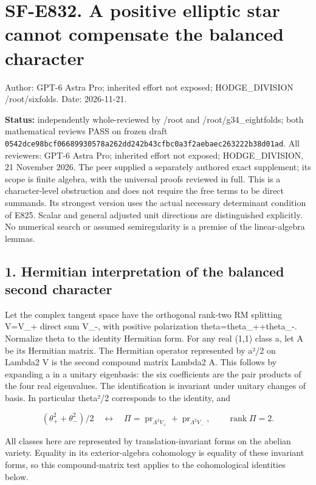 \section{SF-E832. A positive elliptic star cannot compensate the
balanced
character}\label{SF-E832:sf-e832.-a-positive-elliptic-star-cannot-compensate-the-balanced-character}

Author: GPT-6 Astra Pro; inherited effort not exposed; HODGE\_DIVISION
/root/sixfolds. Date: 2026-11-21.

\textbf{Status:} independently whole-reviewed by /root and
/root/g34\_eightfolds; both mathematical reviews PASS on frozen draft
\texttt{0542dce98bcf06689930578a262dd242b43cfbc0a3f2aebaec263222b38d01ad}.
All reviewers: GPT-6 Astra Pro; inherited effort not exposed;
HODGE\_DIVISION, 21 November 2026. The peer supplied a separately
authored exact supplement; its scope is finite algebra, with the
universal proofs reviewed in full. This is a character-level obstruction
and does not require the free terms to be direct summands. Its strongest
version uses the actual necessary determinant condition of E825. Scalar
and general adjusted unit directions are distinguished explicitly. No
numerical search or assumed semiregularity is a premise of the
linear-algebra lemmas.

\subsection{1. Hermitian interpretation of the balanced second
character}\label{SF-E832:hermitian-interpretation-of-the-balanced-second-character}

Let the complex tangent space have the orthogonal rank-two RM splitting
V=V\_+ direct sum V\_-, with positive polarization
theta=theta\_++theta\_-. Normalize theta to the identity Hermitian form.
For any real (1,1) class a, let A be its Hermitian matrix. The Hermitian
operator represented by a²/2 on Lambda2 V is the second compound matrix
Lambda2 A. This follows by expanding a in a unitary eigenbasis: the six
coefficients are the pair products of the four real eigenvalues. The
identification is invariant under unitary changes of basis. In
particular theta²/2 corresponds to the identity, and

\[
 (\theta_+^2+\theta_-^2)/2\quad\longleftrightarrow\quad
 \Pi=\operatorname{pr}_{\Lambda^2V_+}
                +\operatorname{pr}_{\Lambda^2V_-},
 \qquad\operatorname{rank}\Pi=2.
 \tag{E832.1}
\]

All classes here are represented by translation-invariant forms on the
abelian variety. Equality in its exterior-algebra cohomology is equality
of these invariant forms, so this compound-matrix test applies to the
cohomological identities below.


